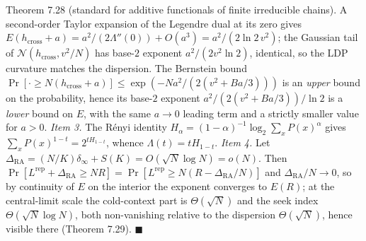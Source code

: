 \documentclass[
]{article}
\begin{document}
Theorem 7.28 (standard for additive functionals of finite irreducible chains).
A second-order Taylor expansion of the Legendre dual at its zero gives
$E(h_{\mathrm{cross}}+a)=a^2/(2\Lambda''(0))+O(a^3)=a^2/(2\ln2\,v^2)$; the Gaussian
tail of $\mathcal N(h_{\mathrm{cross}},v^2/N)$ has base-$2$ exponent
$a^2/(2v^2\ln2)$, identical, so the LDP curvature matches the dispersion. The
Bernstein bound $\Pr[\cdot\ge N(h_{\mathrm{cross}}+a)]\le\exp(-Na^2/(2(v^2+Ba/3)))$
is an \emph{upper} bound on the probability, hence its base-$2$ exponent
$a^2/(2(v^2+Ba/3))/\ln2$ is a \emph{lower} bound on $E$, with the same $a\to0$
leading term and a strictly smaller value for $a>0$. \emph{Item 3.} The R\'enyi
identity $H_\alpha=(1-\alpha)^{-1}\log_2\sum_x P(x)^\alpha$ gives $\sum_x P(x)^{1-t}
=2^{tH_{1-t}}$, whence $\Lambda(t)=tH_{1-t}$. \emph{Item 4.} Let $\Delta_{\mathrm{RA}}
=(N/K)\delta_\infty+S(K)=O(\sqrt N\log N)=o(N)$. Then $\Pr[L^{\mathrm{rep}}+
\Delta_{\mathrm{RA}}\ge NR]=\Pr[L^{\mathrm{rep}}\ge N(R-\Delta_{\mathrm{RA}}/N)]$
and $\Delta_{\mathrm{RA}}/N\to0$, so by continuity of $E$ on the interior the exponent
converges to $E(R)$; at the central-limit scale the cold-context part is $\Theta(\sqrt
N)$ and the seek index $\Theta(\sqrt N\log N)$, both non-vanishing relative to the
dispersion $\Theta(\sqrt N)$, hence visible there (Theorem 7.29). \hfill$\blacksquare$
\end{document}
